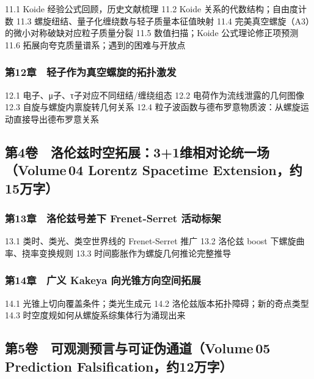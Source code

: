 11.1 Koide 经验公式回顾，历史文献梳理 11.2 Koide
关系的代数结构；自由度计数 11.3
螺旋纽结、量子化缠绕数与轻子质量本征值映射 11.4
完美真空螺旋（A3）的微小对称破缺对应粒子质量分裂 11.5 数值扫描；Koide
公式理论修正项预测 11.6 拓展向夸克质量谱系；遇到的困难与开放点

\subsubsection{第12章 轻子作为真空螺旋的拓扑激发}\label{ux7b2c12ux7ae0-ux8f7bux5b50ux4f5cux4e3aux771fux7a7aux87baux65cbux7684ux62d3ux6251ux6fc0ux53d1}

12.1 电子、μ子、τ子对应不同纽结/缠绕组态 12.2 电荷作为流线泄露的几何图像
12.3 自旋与螺旋内禀旋转几何关系 12.4
粒子波函数与德布罗意物质波：从螺旋运动直接导出德布罗意关系

\subsection{第4卷 洛伦兹时空拓展：3+1维相对论统一场（Volume\,04 Lorentz
Spacetime
Extension，约15万字）}\label{ux7b2c4ux5377-ux6d1bux4f26ux5179ux65f6ux7a7aux62d3ux5c5531ux7ef4ux76f8ux5bf9ux8bbaux7edfux4e00ux573avolume-04-lorentz-spacetime-extensionux7ea615ux4e07ux5b57}

\subsubsection{第13章 洛伦兹号差下 Frenet‑Serret
活动标架}\label{ux7b2c13ux7ae0-ux6d1bux4f26ux5179ux53f7ux5deeux4e0b-frenetserret-ux6d3bux52a8ux6807ux67b6}

13.1 类时、类光、类空世界线的 Frenet‑Serret 推广 13.2 洛伦兹 boost
下螺旋曲率、挠率变换规则 13.3 时间膨胀作为螺旋几何推论完整推导

\subsubsection{第14章 广义 Kakeya
向光锥方向空间拓展}\label{ux7b2c14ux7ae0-ux5e7fux4e49-kakeya-ux5411ux5149ux9525ux65b9ux5411ux7a7aux95f4ux62d3ux5c55}

14.1 光锥上切向覆盖条件；类光生成元 14.2
洛伦兹版本拓扑障碍；新的奇点类型 14.3
时空度规如何从螺旋系综集体行为涌现出来

\subsection{第5卷 可观测预言与可证伪通道（Volume\,05 Prediction
Falsification，约12万字）}\label{ux7b2c5ux5377-ux53efux89c2ux6d4bux9884ux8a00ux4e0eux53efux8bc1ux4f2aux901aux9053volume-05-prediction-falsificationux7ea612ux4e07ux5b57}

